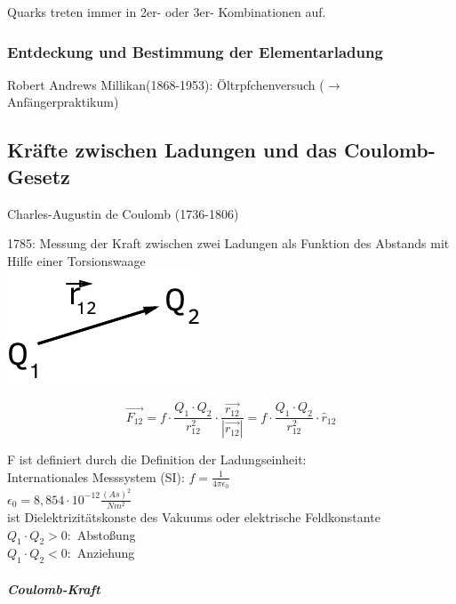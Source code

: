 \documentclass[11pt]{article}
\begin{document}
Quarks treten immer in 2er- oder 3er- Kombinationen auf.
\\

\subsubsection{Entdeckung und Bestimmung der Elementarladung}

Robert Andrews Millikan(1868-1953): Öltrpfchenversuch ($\rightarrow$ Anf\"{a}ngerpraktikum)


\subsection{Kr\"{a}fte zwischen Ladungen und das Coulomb-Gesetz} 

Charles-Augustin de Coulomb (1736-1806)

1785: Messung der Kraft zwischen zwei Ladungen als Funktion des Abstands mit Hilfe einer Torsionswaage \hfill \\

\includegraphics{skizzen/14/14_2B0}

$$ \boxed{\vec{F_{12}} = f\cdot\frac{Q_1\cdot Q_2}{r^2_{12}}\cdot\frac{\vec{r_{12}}}{|\vec{r_{12}}|} = f\cdot\frac{Q_1\cdot Q_2}{r^2_{12}}\cdot \hat{r}_{12}} $$

\noindent F ist definiert durch die Definition der Ladungseinheit:
\\
Internationales Messsystem (SI): $f=\frac{1}{4\pi\epsilon_0}$
\\
$\epsilon_0=8,854\cdot10^{-12}\frac{(As)^2}{Nm^2}$
\\
ist Dielektrizit\"{a}tskonste des Vakuums oder elektrische Feldkonstante
\\
$Q_1\cdot Q_2 > 0:$ Abstoßung
\\
$Q_1\cdot Q_2 < 0:$ Anziehung
\\
\subparagraph{Coulomb-Kraft}

\hfill\\

\end{document}
